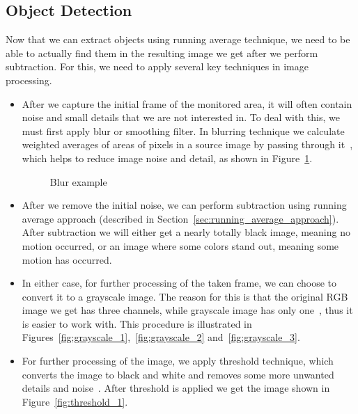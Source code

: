 	\subsection{Object Detection}
	\label{object_detection}
	Now that we can extract objects using running average technique, we need to be able to actually find them in the resulting image we get after we perform subtraction. For this, we need to apply several key techniques in image processing. 
	
	\begin{itemize}
	\item After we capture the initial frame of the monitored area, it will often contain noise and small details that we are not interested in. To deal with this, we must first apply blur or smoothing filter. In blurring technique we calculate weighted averages of areas of pixels in a source image by passing through it~\cite{blur_1}, which helps to reduce image noise and detail, as shown in Figure~\ref{fig:blur_example}.
	\begin{figure}[ht]
		\centering
		\quad
		\caption{Blur example}
		\label{fig:blur_example}
	\end{figure}
	
	\item After we remove the initial noise, we can perform subtraction using running average approach (described in Section~\ref{sec:running_average_approach}). After subtraction we will either get a nearly totally black image, meaning no motion occurred, or an image where some colors stand out, meaning some motion has occurred. 
	
	\item In either case, for further processing of the taken frame, we can choose to convert it to a grayscale image. The reason for this is that the original RGB image we get has three channels, while grayscale image has only one~\cite{grayscale_1}, thus it is easier to work with. This procedure is illustrated in Figures~\ref{fig:grayscale_1},~\ref{fig:grayscale_2} and~\ref{fig:grayscale_3}. 
	
	\item For further processing of the image, we apply threshold technique, which converts the image to black and white and removes some more unwanted details and noise~\cite{threshold_1}. After threshold is applied we get the image shown in Figure~\ref{fig:threshold_1}. 
	

\end{itemize}
